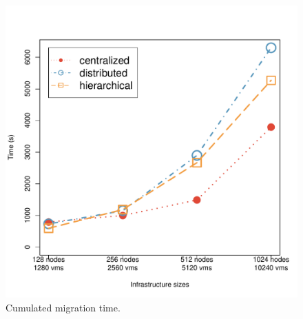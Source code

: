 


\begin{figure}[ht]
\begin{center}
    \includegraphics[width=.65\linewidth]{figures/experiments/migration_time.pdf}
    \caption{Cumulated migration time.}
\end{center}
\label{fig:cumulated_migration_time}
\end{figure}

